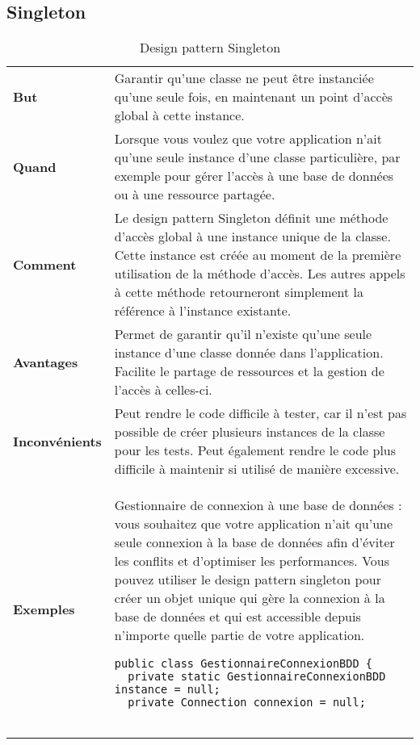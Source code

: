 \subsection{Singleton}
\begin{table}[H]
\caption{Design pattern Singleton}
\label{tbl:design_pattern_singleton}
\begin{adjustbox}{max width=\textwidth}
\begin{tabular}{l|p{\textwidth}}
\toprule
\textbf{But} & Garantir qu'une classe ne peut être instanciée qu'une seule fois, en maintenant un point d'accès global à cette instance.\\
\cmidrule(lr){1-2}
\textbf{Quand} & Lorsque vous voulez que votre application n'ait qu'une seule instance d'une classe particulière, par exemple pour gérer l'accès à une base de données ou à une ressource partagée.\\
\cmidrule(lr){1-2}
\textbf{Comment} & Le design pattern Singleton définit une méthode d'accès global à une instance unique de la classe. Cette instance est créée au moment de la première utilisation de la méthode d'accès. Les autres appels à cette méthode retourneront simplement la référence à l'instance existante.\\
\cmidrule(lr){1-2}
\textbf{Avantages} & Permet de garantir qu'il n'existe qu'une seule instance d'une classe donnée dans l'application. Facilite le partage de ressources et la gestion de l'accès à celles-ci.\\
\cmidrule(lr){1-2}
\textbf{Inconvénients} & Peut rendre le code difficile à tester, car il n'est pas possible de créer plusieurs instances de la classe pour les tests. Peut également rendre le code plus difficile à maintenir si utilisé de manière excessive.\\
\cmidrule(lr){1-2}
\textbf{Exemples} &
\hspace{4mm}
\begin{minipage}[tl]{0.5\textwidth}
\begin{minipage}[t]{1\textwidth}
Gestionnaire de connexion à une base de données : vous souhaitez que votre application n'ait qu'une seule connexion à la base de données afin d'éviter les conflits et d'optimiser les performances. Vous pouvez utiliser le design pattern singleton pour créer un objet unique qui gère la connexion à la base de données et qui est accessible depuis n'importe quelle partie de votre application.
\end{minipage}
\begin{minipage}[b]{1\textwidth}
\begin{lstlisting}[style=monstyle]
public class GestionnaireConnexionBDD {
  private static GestionnaireConnexionBDD instance = null;
  private Connection connexion = null;


\end{lstlisting}
\end{minipage}
\end{minipage}
\end{tabular}
\end{adjustbox}
\end{table}
